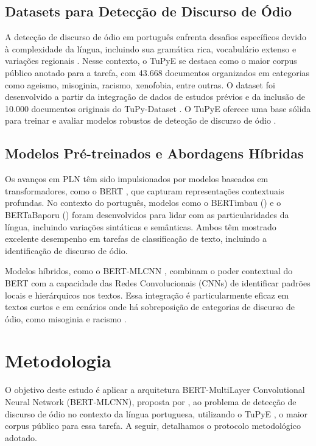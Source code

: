 \documentclass[sigconf,nonacm]{acmart}
\begin{document}
\subsection{Datasets para Detecção de Discurso de Ódio}
A detecção de discurso de ódio em português enfrenta desafios específicos devido à complexidade da língua, incluindo sua gramática rica, 
vocabulário extenso e variações regionais \cite{fortuna-etal-2019-hierarchically}. Nesse contexto, o TuPyE se destaca como o maior corpus público 
anotado para a tarefa, com 43.668 documentos organizados em categorias como ageismo, misoginia, racismo, xenofobia, entre outras. 
O dataset foi desenvolvido a partir da integração de dados de estudos prévios \cite{fortuna-etal-2019-hierarchically} 
\cite{leite2020toxiclanguagedetectionsocial} \cite{vargas-etal-2022-hatebr} e da inclusão de 10.000 documentos originais do TuPy-Dataset \cite{silly-machine_2023}. 
O TuPyE oferece uma base sólida para treinar e avaliar modelos robustos de detecção de discurso de ódio \cite{oliveira2023tupye}.

\subsection{Modelos Pré-treinados e Abordagens Híbridas}
Os avanços em PLN têm sido impulsionados por modelos baseados em transformadores, como o BERT , 
que capturam representações contextuais profundas. 
No contexto do português, modelos como o BERTimbau (\citeauthor{souza2020bertimbau}) e o BERTaBaporu (\citeauthor{costa2023bertabaporu}) 
foram desenvolvidos para lidar com as particularidades da língua, incluindo variações sintáticas e semânticas. 
Ambos têm mostrado excelente desempenho em tarefas de classificação de texto, incluindo a identificação de discurso de ódio.

Modelos híbridos, como o BERT-MLCNN \cite{ATANDOH2023101578}, combinam o poder contextual do BERT com a capacidade das Redes Convolucionais (CNNs) 
de identificar padrões locais e hierárquicos nos textos. Essa integração é particularmente eficaz em textos curtos e em cenários onde há sobreposição 
de categorias de discurso de ódio, como misoginia e racismo \cite{ATANDOH2023101578}\cite{leite2020toxiclanguagedetectionsocial}.

\section{Metodologia}
O objetivo deste estudo é aplicar a arquitetura BERT-MultiLayer Convolutional Neural Network (BERT-MLCNN), proposta por \citeauthor{ATANDOH2023101578}, 
ao problema de detecção de discurso de ódio no contexto da língua portuguesa, utilizando o TuPyE \cite{oliveira2023tupye}, 
o maior corpus público para essa tarefa. A seguir, detalhamos o protocolo metodológico adotado.
\end{document}
